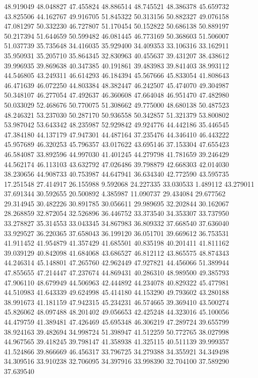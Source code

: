 48.919049
48.048827
47.455824
48.886514
48.745521
48.386378
45.659732
43.825506
44.162767
49.916705
51.845322
50.313156
50.882327
49.076158
47.081297
50.332230
46.727807
51.170454
50.152822
50.686138
50.889197
50.217394
51.644659
50.599482
46.081445
46.773169
50.368603
51.506007
51.037739
35.735648
34.416035
35.929400
34.409353
33.106316
33.162911
35.950931
35.205710
35.864345
32.830963
40.455637
39.431207
38.438612
39.996935
39.869638
40.347385
40.191861
39.483983
39.841403
38.993112
44.546805
43.249311
46.614293
46.184394
45.567666
45.833054
41.808643
46.471639
46.072250
44.803384
48.382447
46.242507
45.474070
49.304987
50.348107
46.277054
47.492637
46.360608
47.664048
46.951470
47.482980
50.033029
52.468676
50.770075
51.308662
49.775000
48.680138
50.487523
48.246321
53.237030
50.287170
50.936558
50.342857
51.321379
53.800802
53.987042
53.643342
48.235987
52.929842
49.924776
44.442186
35.446545
47.384180
44.137179
47.947301
44.487164
37.235476
44.346410
46.443222
45.957689
46.320253
45.796357
43.017622
43.695146
37.153304
47.655423
46.584087
33.892596
44.997030
41.401245
44.279798
41.781659
39.246429
44.562174
46.113103
43.632792
47.026486
39.798879
42.668303
42.014030
38.230656
44.908733
40.753987
44.647941
36.634340
42.772590
43.595735
17.251548
27.414917
26.155988
9.592068
24.227335
33.030533
1.489112
43.279011
37.691344
30.592655
20.500892
4.385987
11.090737
29.434084
29.677562
29.314945
30.482226
30.891785
30.056611
29.989695
32.202844
30.162067
28.268859
32.872054
32.526896
36.446752
33.373540
34.353307
33.737950
33.278827
35.314553
33.043345
34.867983
36.809332
37.668540
37.636040
33.929527
36.220365
37.658043
36.199120
36.051701
39.669612
36.753531
41.911452
41.954879
41.357429
41.685501
40.835198
40.201411
41.811162
39.039129
40.842098
41.684068
43.686527
46.812112
43.865575
48.874343
44.246314
45.148801
47.265760
42.962449
47.927821
44.456066
51.389944
47.855655
47.214447
47.237674
44.869431
40.286310
48.989500
49.385793
47.906110
48.679949
44.506963
42.444892
44.234078
40.829322
45.477981
44.510983
41.643339
49.624998
45.414180
44.153290
49.793602
43.280188
38.991673
41.181159
47.942315
45.234231
46.574665
39.369410
43.500274
45.826062
48.097488
48.201402
49.056653
42.425248
44.323016
45.100056
44.479759
41.389481
47.426469
45.695348
46.306219
47.289724
39.655799
38.924163
39.482694
34.998724
51.398947
41.512259
50.772765
38.027998
44.967565
39.418245
39.798147
41.358938
41.325115
40.511139
39.999357
41.524866
39.866669
46.456317
33.796725
34.279388
34.355921
34.349498
34.309516
33.910238
32.706095
34.397916
33.998390
32.704100
37.589290
37.639540
